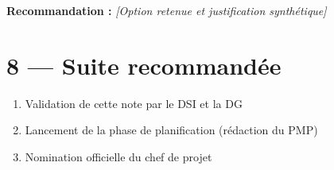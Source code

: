 \documentclass[11pt,a4paper,oneside]{report}
\begin{document}
\begin{reco}
\textbf{Recommandation :} \textit{[Option retenue et justification synthétique]}
\end{reco}

\section*{8 — Suite recommandée}

\begin{enumerate}
  \item Validation de cette note par le DSI et la DG
  \item Lancement de la phase de planification (rédaction du PMP)
  \item Nomination officielle du chef de projet
\end{enumerate}
\end{document}
